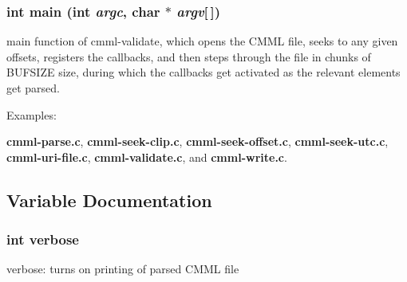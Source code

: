 \subsubsection{\setlength{\rightskip}{0pt plus 5cm}int main (int {\em argc}, char $\ast$ {\em argv}[$\,$])}\label{cmml-validate_8c_a6}


main function of cmml-validate, which opens the CMML file, seeks to any given offsets, registers the callbacks, and then steps through the file in chunks of BUFSIZE size, during which the callbacks get activated as the relevant elements get parsed. \begin{Desc}
\item[Examples: ]\par
{\bf cmml-parse.c}, {\bf cmml-seek-clip.c}, {\bf cmml-seek-offset.c}, {\bf cmml-seek-utc.c}, {\bf cmml-uri-file.c}, {\bf cmml-validate.c}, and {\bf cmml-write.c}.\end{Desc}


\subsection{Variable Documentation}
\subsubsection{\setlength{\rightskip}{0pt plus 5cm}int {\bf verbose}\hspace{0.3cm}{\tt  [static]}}\label{cmml-validate_8c_a1}


verbose: turns on printing of parsed CMML file 